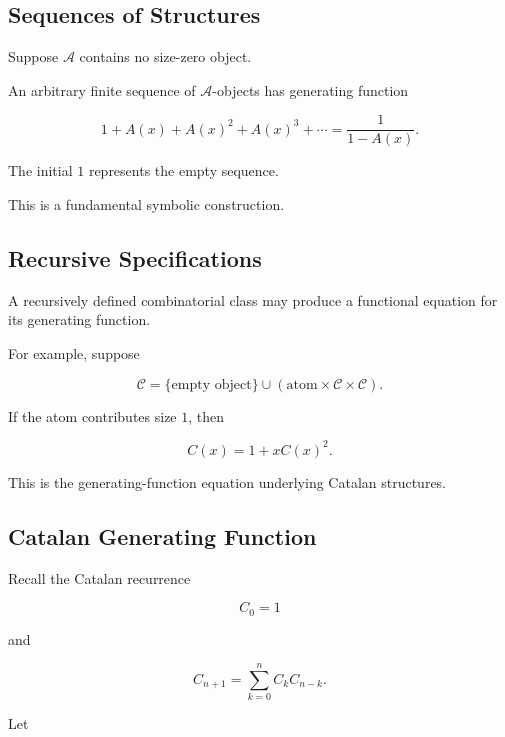 \subsection{Sequences of Structures}
\label{subsec:gf-sequences-structures}

Suppose \(\mathcal{A}\) contains no size-zero object.

An arbitrary finite sequence of \(\mathcal{A}\)-objects has generating
function

\[
\boxed{
1+A(x)+A(x)^2+A(x)^3+\cdots
=
\frac{1}{1-A(x)}.
}
\]

The initial \(1\) represents the empty sequence.

This is a fundamental symbolic construction.

\subsection{Recursive Specifications}
\label{subsec:gf-recursive-specifications}

A recursively defined combinatorial class may produce a functional
equation for its generating function.

For example, suppose

\[
\mathcal{C}
=
\{\text{empty object}\}
\cup
\left(
\text{atom}
\times
\mathcal{C}
\times
\mathcal{C}
\right).
\]

If the atom contributes size \(1\), then

\[
\boxed{
C(x)
=
1+xC(x)^2.
}
\]

This is the generating-function equation underlying Catalan structures.

\subsection{Catalan Generating Function}
\label{subsec:catalan-generating-function}

Recall the Catalan recurrence

\[
C_0=1
\]

and

\[
C_{n+1}
=
\sum_{k=0}^{n}C_kC_{n-k}.
\]

Let

